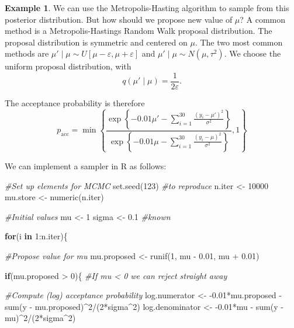 \documentclass[
]{book}
\newenvironment{Shaded}{\begin{snugshade}}{\end{snugshade}}
\newcommand{\CommentTok}[1]{\textcolor[rgb]{0.56,0.35,0.01}{\textit{#1}}}
\newcommand{\ControlFlowTok}[1]{\textcolor[rgb]{0.13,0.29,0.53}{\textbf{#1}}}
\newcommand{\DecValTok}[1]{\textcolor[rgb]{0.00,0.00,0.81}{#1}}
\newcommand{\FloatTok}[1]{\textcolor[rgb]{0.00,0.00,0.81}{#1}}
\newcommand{\FunctionTok}[1]{\textcolor[rgb]{0.00,0.00,0.00}{#1}}
\newcommand{\NormalTok}[1]{#1}
\newcommand{\OtherTok}[1]{\textcolor[rgb]{0.56,0.35,0.01}{#1}}
\newcommand{\SpecialCharTok}[1]{\textcolor[rgb]{0.00,0.00,0.00}{#1}}
\theoremstyle{definition}
\theoremstyle{definition}
\newtheorem{example}{Example}[chapter]
\theoremstyle{definition}
\theoremstyle{definition}
\theoremstyle{remark}
\begin{document}
\begin{example}
We can use the Metropolis-Hasting algorithm to sample from this posterior distribution. But how should we propose new value of \(\mu\)? A common method is a Metropolis-Hastings Random Walk proposal distribution. The proposal distribution is symmetric and centered on \(\mu\). The two most common methods are \(\mu' \mid \mu \sim U[\mu - \varepsilon, \mu + \varepsilon]\) and \(\mu' \mid \mu \sim N(\mu, \tau^2)\). We choose the uniform proposal distribution, with
\[
q(\mu' \mid \mu) = \frac{1}{2\varepsilon}.
\]

The acceptance probability is therefore
\[
p_\textrm{acc} = \min\left\{\frac{\exp\left\{-0.01\mu' -\sum_{i=1}^{30}\frac{(y_i - \mu')^2}{\sigma^2}\right\} }{\exp\left\{-0.01\mu -\sum_{i=1}^{30}\frac{(y_i - \mu)^2}{\sigma^2}\right\} }, 1\right\}
\]

We can implement a sampler in R as follows:

\begin{Shaded}
\begin{Highlighting}[]
\CommentTok{\#Set up elements for MCMC}
\FunctionTok{set.seed}\NormalTok{(}\DecValTok{123}\NormalTok{) }\CommentTok{\#to reproduce}
\NormalTok{n.iter   }\OtherTok{\textless{}{-}} \DecValTok{10000}
\NormalTok{mu.store }\OtherTok{\textless{}{-}} \FunctionTok{numeric}\NormalTok{(n.iter)}

\CommentTok{\#Initial values}
\NormalTok{mu }\OtherTok{\textless{}{-}} \DecValTok{1} 
\NormalTok{sigma }\OtherTok{\textless{}{-}} \FloatTok{0.1} \CommentTok{\#known}

\ControlFlowTok{for}\NormalTok{(i }\ControlFlowTok{in} \DecValTok{1}\SpecialCharTok{:}\NormalTok{n.iter)\{}
  
  \CommentTok{\#Propose value for mu}
\NormalTok{  mu.proposed }\OtherTok{\textless{}{-}} \FunctionTok{runif}\NormalTok{(}\DecValTok{1}\NormalTok{, mu }\SpecialCharTok{{-}} \FloatTok{0.01}\NormalTok{, mu }\SpecialCharTok{+} \FloatTok{0.01}\NormalTok{)}
  
  \ControlFlowTok{if}\NormalTok{(mu.proposed }\SpecialCharTok{\textgreater{}} \DecValTok{0}\NormalTok{)\{ }\CommentTok{\#If mu \textless{} 0 we can reject straight away}
    
    \CommentTok{\#Compute (log) acceptance probability}
\NormalTok{    log.numerator   }\OtherTok{\textless{}{-}} \SpecialCharTok{{-}}\FloatTok{0.01}\SpecialCharTok{*}\NormalTok{mu.proposed }\SpecialCharTok{{-}} \FunctionTok{sum}\NormalTok{(y }\SpecialCharTok{{-}}\NormalTok{ mu.proposed)}\SpecialCharTok{\^{}}\DecValTok{2}\SpecialCharTok{/}\NormalTok{(}\DecValTok{2}\SpecialCharTok{*}\NormalTok{sigma}\SpecialCharTok{\^{}}\DecValTok{2}\NormalTok{)}
\NormalTok{    log.denominator }\OtherTok{\textless{}{-}} \SpecialCharTok{{-}}\FloatTok{0.01}\SpecialCharTok{*}\NormalTok{mu }\SpecialCharTok{{-}} \FunctionTok{sum}\NormalTok{(y }\SpecialCharTok{{-}}\NormalTok{ mu)}\SpecialCharTok{\^{}}\DecValTok{2}\SpecialCharTok{/}\NormalTok{(}\DecValTok{2}\SpecialCharTok{*}\NormalTok{sigma}\SpecialCharTok{\^{}}\DecValTok{2}\NormalTok{)}
    

\end{Highlighting}
\end{Shaded}
\end{example}
\end{document}
